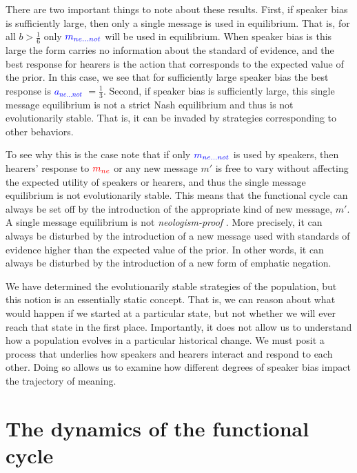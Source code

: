 \documentclass[linguex]{sp}
\theoremstyle{definition} \newtheorem{definition}{Definition}
\begin{document}
There are two important things to note about these results. First, if speaker bias is sufficiently large, then only a single message is used in equilibrium. That is, for all $b > \frac{1}{6}$ only $\textcolor{blue}{m_{ne...not}}$ will be used in equilibrium.  When speaker bias is this large the form carries no information about the standard of evidence, and the best response for hearers is the action that corresponds to the expected value of the prior. In this case, we see that for sufficiently large speaker bias the best response is \emph{\textcolor{blue}{$a_{ne...not}$}} $ = \frac{1}{3}$. Second, if speaker bias is sufficiently large, this single message equilibrium is not a strict Nash equilibrium and thus is not evolutionarily stable. That is, it can be invaded by strategies corresponding to other behaviors. 

To see why this is the case note that if only $\textcolor{blue}{m_{ne...not}}$ is used by speakers, then hearers' response to $\textcolor{red}{m_{ne}}$ or any new message $m'$ is free to vary without affecting the expected utility of speakers or hearers, and thus the single message equilibrium is not evolutionarily stable.  This means that the functional cycle can always be set off by the introduction of the appropriate kind of new message, $m'$. A single message equilibrium is not \emph{neologism-proof} \citep[526]{farrell:1993}. More precisely, it can always be disturbed by the introduction of a new message used with standards of evidence higher than the expected value of the prior. In other words, it can always be disturbed by the introduction of a new form of emphatic negation.

We have determined the evolutionarily stable strategies of the population, but this notion is an essentially static concept. That is, we can reason about what would happen if we started at a particular state, but not whether we will ever reach that state in the first place. Importantly, it does not allow us to understand how a population evolves in a particular historical change. We must posit a process that underlies how speakers and hearers interact and respond to each other. Doing so allows us to examine how different degrees of speaker bias impact the trajectory of meaning. 



\section{The dynamics of the functional cycle}
\label{Dynamics}
\end{document}
